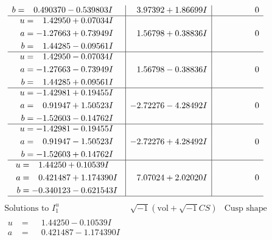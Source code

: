 \documentclass[1p]{elsarticle_modified}
\theoremstyle{definition}
\newcommand{\I}{\sqrt{-1}}
\begin{document}
$$\begin{array}{c|c|c}
\begin{aligned}
b &= \phantom{-}0.490370 - 0.539803 I\end{aligned}
 & \phantom{-}3.97392 + 1.86699 I & \phantom{-0.000000 } 0 \\ \hline\begin{aligned}
u &= \phantom{-}1.42950 + 0.07034 I \\
a &= -1.27663 + 0.73949 I \\
b &= \phantom{-}1.44285 - 0.09561 I\end{aligned}
 & \phantom{-}1.56798 + 0.38836 I & \phantom{-0.000000 } 0 \\ \hline\begin{aligned}
u &= \phantom{-}1.42950 - 0.07034 I \\
a &= -1.27663 - 0.73949 I \\
b &= \phantom{-}1.44285 + 0.09561 I\end{aligned}
 & \phantom{-}1.56798 - 0.38836 I & \phantom{-0.000000 } 0 \\ \hline\begin{aligned}
u &= -1.42981 + 0.19455 I \\
a &= \phantom{-}0.91947 + 1.50523 I \\
b &= -1.52603 - 0.14762 I\end{aligned}
 & -2.72276 - 4.28492 I & \phantom{-0.000000 } 0 \\ \hline\begin{aligned}
u &= -1.42981 - 0.19455 I \\
a &= \phantom{-}0.91947 - 1.50523 I \\
b &= -1.52603 + 0.14762 I\end{aligned}
 & -2.72276 + 4.28492 I & \phantom{-0.000000 } 0 \\ \hline\begin{aligned}
u &= \phantom{-}1.44250 + 0.10539 I \\
a &= \phantom{-}0.421487 + 1.174390 I \\
b &= -0.340123 - 0.621543 I\end{aligned}
 & \phantom{-}7.07024 + 2.02020 I & \phantom{-0.000000 } 0\\
 \hline 
 \end{array}$$\newpage$$\begin{array}{c|c|c}  
\text{Solutions to }I^u_{1}& \I (\text{vol} + \sqrt{-1}CS) & \text{Cusp shape}\\
 \hline 
\begin{aligned}
u &= \phantom{-}1.44250 - 0.10539 I \\
a &= \phantom{-}0.421487 - 1.174390 I \\

\end{aligned}
\end{array}$$
\end{document}
